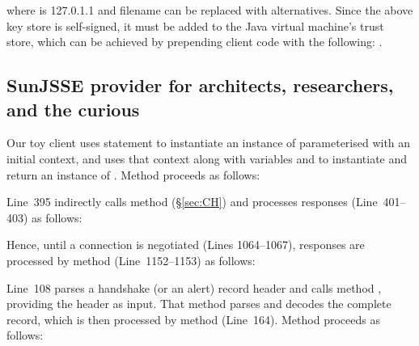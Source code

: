 \noindent
where  is 127.0.1.1 and filename  can 
be replaced with alternatives. Since the above key store is 
self-signed, it must be added to the Java virtual machine's trust store, which can 
be achieved by prepending client code with the following:
.



\subsection{SunJSSE provider for architects, researchers, and the curious}\label{sec:SunJSSE}

Our toy client uses statement  
to instantiate an instance of 
 parameterised with an initial context, and uses that 
context along with variables  and  to instantiate and return an 
instance of . Method  proceeds as follows:



\noindent
Line~395 indirectly calls method  (\S\ref{sec:CH}) and processes 
responses (Line~401--403) as follows:



\noindent
Hence, until a connection is negotiated (Lines 1064--1067), responses are processed by 
method  (Line~1152--1153) as follows:



\begin{sloppypar}
\noindent
Line~108 parses a handshake (or an alert) record header and calls method 
, providing the header as 
input. That method parses and decodes the complete record, which is then 
processed by method  (Line~164).
%
Method  proceeds as follows:
\end{sloppypar}

